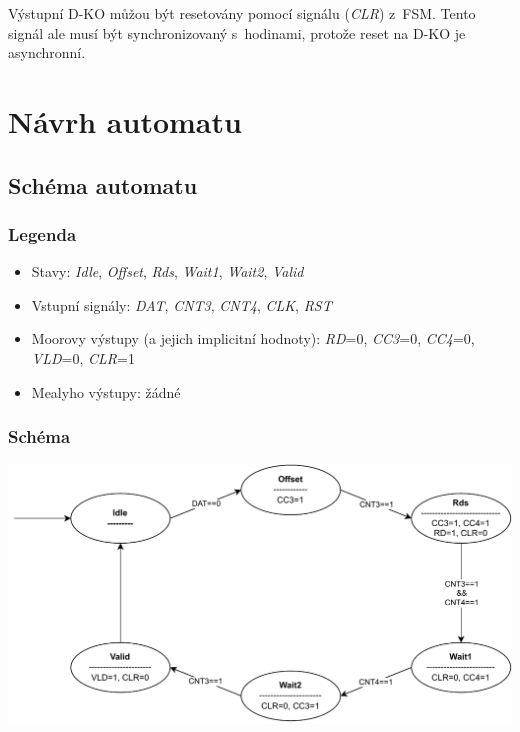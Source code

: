 \documentclass{article}
\begin{document}
Výstupní D-KO můžou být resetovány pomocí signálu (\emph{CLR}) z~FSM. Tento
signál ale musí být synchronizovaný s~hodinami, protože reset na D-KO je
asynchronní.

\newpage

\section{Návrh automatu}

\subsection{Schéma automatu}

\subsubsection{Legenda}

\begin{itemize}
    \item Stavy: \emph{Idle}, \emph{Offset}, \emph{Rds}, \emph{Wait1},
          \emph{Wait2}, \emph{Valid}
    \item Vstupní signály: \emph{DAT}, \emph{CNT3}, \emph{CNT4}, \emph{CLK},
          \emph{RST}
    \item Moorovy výstupy (a jejich implicitní hodnoty): \emph{RD}=0,
          \emph{CC3}=0, \emph{CC4}=0, \emph{VLD}=0, \emph{CLR}=1
    \item Mealyho výstupy: žádné
\end{itemize}

\subsubsection{Schéma}

\includegraphics*[scale=0.9]{assets/FSM.pdf}
\end{document}
